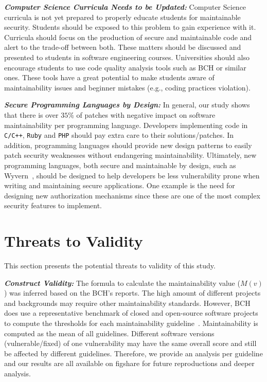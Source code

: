 \documentclass[smallextended]{svjour3}       %
\begin{document}
\textit{\textbf{Computer Science Curricula Needs to be Updated:}}
	Computer Science curricula is not yet prepared to properly educate 
	students for maintainable security. Students should be exposed to 
	this problem to gain experience with it. Curricula should focus on 
	the production of secure and maintainable code and alert to the 
	trade-off between both. These matters should be discussed and 
	presented to students in software engineering courses.
	Universities should also encourage students to use code quality 
	analysis tools such as BCH or similar ones. These tools have a 
	great potential to make students aware of maintainability issues 
	and beginner mistakes (e.g., coding practices violation).
%	

\textit{\textbf{Secure Programming Languages by Design:}} 
In general, our study 
shows that there is over $35\%$ of patches with negative impact 
on software maintainability per programming language. Developers implementing code in   
\texttt{C/C++}, \texttt{Ruby} and \texttt{PHP} should pay extra care 
to their solutions/patches. In addition, programming 
	languages should provide new design patterns to easily patch security weaknesses 
	without endangering maintainability. Ultimately, new programming languages, 
	both secure and maintainable by design, such as Wyvern~\cite{10.1145/2489828.2489830,kurilova2014wyvern}, 
	should be designed to help developers be less vulnerability prone when 
	writing and maintaining secure applications. One example is the need for 
	designing new authorization mechanisms since these are one of the most 
	complex security features to implement.

\section{Threats to Validity}\label{sec:threats}
%
This section presents the potential threats to validity of this study.
%

\textit{\textbf{Construct Validity:}} The formula to calculate the maintainability value ($M(v)$) was inferred based 
on the BCH's reports. The high amount of different projects and backgrounds 
may require other maintainability standards. However, BCH does use a 
representative benchmark of closed and open-source software projects to compute 
the thresholds for each maintainability guideline~\cite{Visser:2016:OREILLY,baggen2012}.
Maintainability is computed as the mean of all guidelines. Different software versions 
(vulnerable/fixed) of one vulnerability may have the same overall score
and still be affected by different guidelines. Therefore, we provide
an analysis per guideline and our results are all available on figshare for future reproductions and deeper analysis. 
\end{document}
